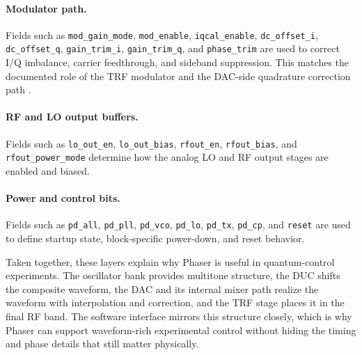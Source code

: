 \paragraph{Modulator path.}
Fields such as \texttt{mod\_gain\_mode}, \texttt{mod\_enable}, \texttt{iqcal\_enable}, \texttt{dc\_offset\_i}, \texttt{dc\_offset\_q}, \texttt{gain\_trim\_i}, \texttt{gain\_trim\_q}, and \texttt{phase\_trim} are used to correct I/Q imbalance, carrier feedthrough, and sideband suppression. This matches the documented role of the TRF modulator and the DAC-side quadrature correction path \cite{dac34h84, trf372017}.

\paragraph{RF and LO output buffers.}
Fields such as \texttt{lo\_out\_en}, \texttt{lo\_out\_bias}, \texttt{rfout\_en}, \texttt{rfout\_bias}, and \texttt{rfout\_power\_mode} determine how the analog LO and RF output stages are enabled and biased.

\paragraph{Power and control bits.}
Fields such as \texttt{pd\_all}, \texttt{pd\_pll}, \texttt{pd\_vco}, \texttt{pd\_lo}, \texttt{pd\_tx}, \texttt{pd\_cp}, and \texttt{reset} are used to define startup state, block-specific power-down, and reset behavior.

Taken together, these layers explain why Phaser is useful in quantum-control experiments. The oscillator bank provides multitone structure, the DUC shifts the composite waveform, the DAC and its internal mixer path realize the waveform with interpolation and correction, and the TRF stage places it in the final RF band. The software interface mirrors this structure closely, which is why Phaser can support waveform-rich experimental control without hiding the timing and phase details that still matter physically.